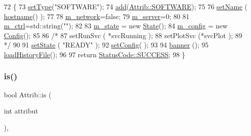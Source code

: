 \begin{DoxyCode}
72                                      \{
73   \hyperlink{classObject_aae534cc9d982bcb9b99fd505f2e103a5}{setType}(\textcolor{stringliteral}{"SOFTWARE"});
74   \hyperlink{classAttrib_a235f773af19c900264a190b00a3b4ad7}{add}(\hyperlink{classAttrib_a69e171d7cc6417835a5a306d3c764235a103a67cd0b8f07ef478fa45d4356e27b}{Attrib::SOFTWARE});
75 
76   \hyperlink{classObject_ae30fea75683c2d149b6b6d17c09ecd0c}{setName} ( \hyperlink{classApplication_a095248805e26b553466b7fafc6517d8f}{hostname}() );
77 
78   \hyperlink{classApplication_a7dc2bb72356cd9186eaad49eb506995a}{m\_network}=\textcolor{keyword}{false};
79   \hyperlink{classApplication_a5e6085b0f322d5036177b16113a75b56}{m\_server}=0;
80 
81   \hyperlink{classApplication_aa371ed989ed34038df400c4d1b41b37f}{m\_ctrl}=std::string(\textcolor{stringliteral}{""});
82 
83   \hyperlink{classApplication_a0ef9832e2d286716e597a1ff21ffcab4}{m\_state}  = \textcolor{keyword}{new} \hyperlink{classState}{State}();
84   \hyperlink{classApplication_ae05f3e253ea871a194c3d30fd1d3b0c3}{m\_config} = \textcolor{keyword}{new} \hyperlink{classConfig}{Config}();
85 
86   \textcolor{comment}{/*}
87 \textcolor{comment}{    setRunSvc ( *svcRunning );
}
88 \textcolor{comment}{    setPlotSvc (*svcPlot );
}
89 \textcolor{comment}{  */}
90 
91   \hyperlink{classApplication_a4a86c9bbf7851753c7b2bc03211092fb}{setState} ( \textcolor{stringliteral}{"READY"} );
92   \hyperlink{classApplication_a46614964f765fd5374b216582b599bcb}{setConfig}( );
93 
94   \hyperlink{classApplication_af168aa3579262d65adc0bd4531361a53}{banner}  ();
95   \hyperlink{classApplication_ab5d46fc4784a4c821e974f5a47ec933d}{loadHistoryFile}();
96 
97   \textcolor{keywordflow}{return} \hyperlink{classStatusCode_a6f565cbeadc76d14c72f047e5e85eb4badd0da38d3ba0d922efd1f4619bc37ad8}{StatusCode::SUCCESS};
98 \}
\end{DoxyCode}
\mbox{\label{classAttrib_a704f26af560909ad22065083bb7d4c34}} 
\subsubsection{\texorpdfstring{is()}{is()}}
{\footnotesize\ttfamily bool Attrib\+::is (\begin{DoxyParamCaption}\item[{int}]{attribut }\end{DoxyParamCaption})\hspace{0.3cm}{\ttfamily [inline]}, {\ttfamily [inherited]}}


